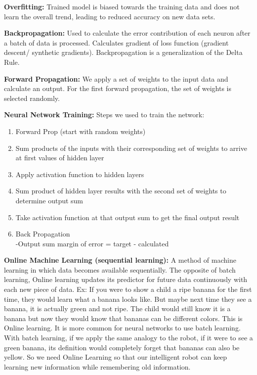 \documentclass[draftclsnofoot, onecolumn, 10pt, compsoc]{IEEEtran}
\begin{document}
		\noindent\textbf{Overfitting:} Trained model is biased towards the training data and does not learn the overall trend, leading to reduced accuracy on new data sets.

		\noindent\textbf{Backpropagation:} Used to calculate the error contribution of each neuron after a batch of data is processed. Calculates gradient of loss function (gradient descent/ synthetic gradients). Backpropagation is a generalization of the Delta Rule.

		\noindent\textbf{Forward Propagation:} We apply a set of weights to the input data and calculate an output. For the first forward propagation, the set of weights is selected randomly.

		\noindent\textbf{Neural Network Training:} Steps we used to train the network:
			\begin{enumerate}
				\item Forward Prop (start with random weights)
				\item Sum products of the inputs with their corresponding set of weights to arrive at first values of hidden layer
				\item Apply activation function to hidden layers
				\item Sum product of hidden layer results with the second set of weights to determine output sum
				\item Take activation function at that output sum to get the final output result
				\item Back Propagation \cite{neuralnets} \\
				-Output sum margin of error = target - calculated
			\end{enumerate}

		\noindent\textbf{Online Machine Learning (sequential learning):} A method of machine learning in which data becomes available sequentially. The opposite of batch learning, Online learning updates its predictor for future data continuously with each new piece of data. Ex: If you were to show a child a ripe banana for the first time, they would learn what a banana looks like. But maybe next time they see a banana, it is actually green and not ripe. The child would still know it is a banana but now they would know that bananas can be different colors. This is Online learning. It is more common for neural networks to use batch learning. With batch learning, if we apply the same analogy to the robot, if it were to see a green banana, its definition would completely forget that bananas can also be yellow. So we need Online Learning so that our intelligent robot can keep learning new information while remembering old information.
\end{document}
